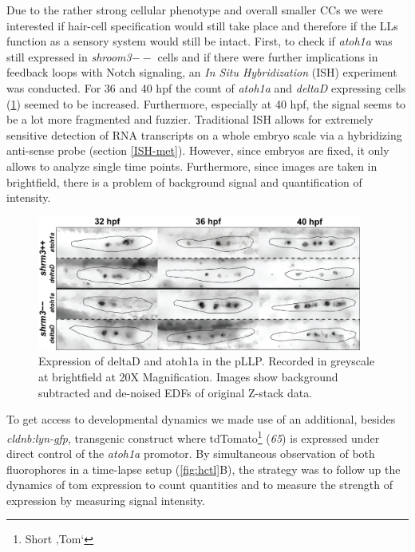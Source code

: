 \documentclass[11pt,singlespacinge,twoside]{reedthesis} %
\begin{document}
Due to the rather strong cellular phenotype and overall smaller CCs we were interested if hair-cell specification would still take place and therefore if the LLs function as a sensory system would still be intact. First, to check if \emph{atoh1a} was still expressed in \emph{shroom3}\(--\) cells and if there were further implications in feedback loops with Notch signaling, an \emph{In Situ Hybridization} (ISH) experiment was conducted. For 36 and 40 hpf the count of \emph{atoh1a} and \emph{deltaD} expressing cells (\ref{fig:hcish}) seemed to be increased. Furthermore, especially at 40 hpf, the signal seems to be a lot more fragmented and fuzzier.
Traditional ISH allows for extremely sensitive detection of RNA transcripts on a whole embryo scale via a hybridizing anti-sense probe (section \ref{ISH-met}). However, since embryos are fixed, it only allows to analyze single time points. Furthermore, since images are taken in brightfield, there is a problem of background signal and quantification of intensity.


\begin{figure}

{\centering \includegraphics[width=0.95\textwidth]{figures/results/05_atoh/hc_ish} 

}

\caption[Expression of deltaD and atoh1a in the pLLP]{Expression of deltaD and atoh1a in the pLLP. Recorded in greyscale at brightfield at 20X Magnification. Images show background subtracted and de-noised EDFs of original Z-stack data.}\label{fig:hcish}
\end{figure}
To get access to developmental dynamics we made use of an additional, besides \emph{cldnb:lyn-gfp}, transgenic construct where tdTomato\footnote{Short ‚Tom`} (\emph{65}) is expressed under direct control of the \emph{atoh1a} promotor. By simultaneous observation of both fluorophores in a time-lapse setup (\ref{fig:hctl}B), the strategy was to follow up the dynamics of tom expression to count quantities and to measure the strength of expression by measuring signal intensity.
\end{document}
